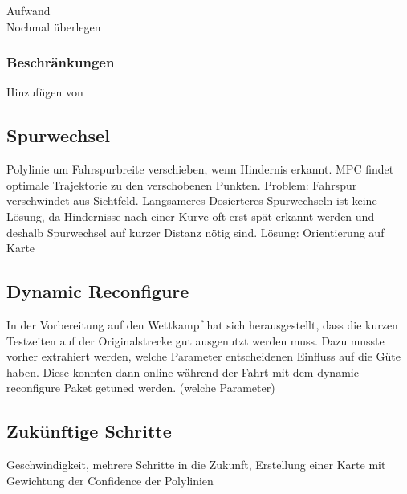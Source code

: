 Aufwand\\
Nochmal überlegen\\

\subsubsection{Beschränkungen}
Hinzufügen von ~
\subsection{Spurwechsel}
Polylinie um Fahrspurbreite verschieben, wenn Hindernis erkannt. MPC findet optimale Trajektorie zu den verschobenen Punkten. Problem: Fahrspur verschwindet aus Sichtfeld. Langsameres Dosierteres Spurwechseln ist keine Lösung, da Hindernisse nach einer Kurve oft erst spät erkannt werden und deshalb Spurwechsel auf kurzer Distanz nötig sind. Lösung: Orientierung auf Karte

\subsection{Dynamic Reconfigure}
In der Vorbereitung auf den Wettkampf hat sich herausgestellt, dass die kurzen Testzeiten auf der Originalstrecke gut ausgenutzt werden muss. Dazu musste vorher extrahiert werden, welche Parameter entscheidenen Einfluss auf die Güte haben. Diese konnten dann online während der Fahrt mit dem dynamic reconfigure Paket getuned werden. (welche Parameter)\\
\subsection{Zukünftige Schritte}
Geschwindigkeit, mehrere Schritte in die Zukunft, Erstellung einer Karte mit Gewichtung der Confidence der Polylinien